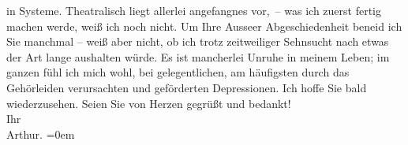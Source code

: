 \begin{ledgroupsized}[t]{13cm}
                    in Systeme. Theatralisch
                    liegt allerlei angefangnes vor, – was ich zuerst fertig machen werde, weiß ich
                    noch nicht.\pend
           \pstart
           Um Ihre Ausseer Abgeschiedenheit beneid ich Sie
                    manchmal – weiß aber nicht, ob ich  trotz
                    zeitweiliger Sehnsucht nach etwas der Art lange aushalten würde. Es ist
                    mancherlei Unruhe in meinem Leben; im ganzen fühl ich mich wohl, bei
                    gelegentlichen, am häufigsten durch das Gehörleiden verursachten und geförderten
                    Depressionen.\pend
           \pstart
           Ich hoffe Sie bald wiederzusehen.\pend
           \pstart
           Seien Sie von Herzen gegrüßt und bedankt!{\\[\baselineskip]}Ihr{\\[\baselineskip]}\spacefill\mbox{Arthur.}\pend
           \leftskip=0em{}\endnumbering{}\end{ledgroupsized}  \newcommand{\dateiname}{L02455}\newcommand{\titel}{Arthur Schnitzler an Hugo Hofmannsthal, 16. 11. 1925}\newcommand{\editorInnen}{Martin Anton Müller und Gerd-Hermann Susen}
      